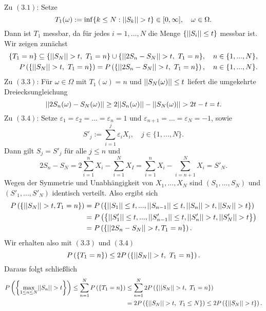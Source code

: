 \begin{proof*}
    Zu $(3.1)$:
    Setze 
    $$
        T_1(\omega) := \inf\{ k \leq N: \lvert\lvert S_k \rvert\rvert > t \} \in [0, \infty], \quad \omega \in \Omega. 
    $$
    Dann ist $T_1$ messbar, da für jedes $i =1,...,N$ die Menge $\{ \lvert\lvert S_i \rvert\rvert \leq t\}$ messbar ist. 
    Wir zeigen zunächst
    \begin{align}
        \{T_1 = n\} \subseteq \{\lvert\lvert S_N \rvert\rvert > t,\  T_1 = n\} \cup \{\lvert\lvert 2S_n - S_N \rvert\rvert>t,\  T_1=n\}, \quad n \in \{1,...,N\}, \\\
        P\left(\left\{ \lvert\lvert S_N \rvert\rvert > t, \ T_1=n \right\}\right) = P\left(\left\{ \lvert\lvert 2S_n - S_N \rvert\rvert > t,\  T_1=n \right\}\right), \quad n \in \{1,...,N\}. 
    \end{align}
    Zu $(3.3)$:
    Für $\omega \in \Omega$ mit $T_1(\omega) = n$ und $\lvert\lvert S_N(\omega) \rvert\rvert \leq t$ liefert die umgekehrte Dreiecksungleichung
    $$
        \lvert\lvert 2S_n(\omega) - S_N(\omega) \rvert\rvert \geq 2\lvert\lvert S_n(\omega) \rvert\rvert - \lvert\lvert S_N(\omega) \rvert\rvert > 2t - t = t. 
    $$
    Zu $(3.4)$: Setze $\varepsilon_1 = \varepsilon_2 = ... = \varepsilon_n = 1$ und $\varepsilon_{n+1} = ... = \varepsilon_N = -1$, sowie
    $$
        S'_j := \sum_{i=1}^j\varepsilon_i X_i, \quad j \in \{1,...,N\}. 
    $$
    Dann gilt $S_j = S'_j$ für alle $j \leq n$ und 
    $$
        2S_n - S_N = 2 \sum_{i=1}^n X_i - \sum_{i=1}^N X_I = \sum_{i=1}^nX_i - \sum_{i=n+1}^N X_i = S'_N. 
    $$
    Wegen der Symmetrie und Unabhängigkeit von $X_1,...,X_N$ sind $(S_1,...,S_N)$ und $(S'_1,...,S'_N)$ identisch verteilt. Also ergibt sich 
    \begin{align*}
        P\left(\left\{ \lvert\lvert S_N \rvert\rvert > t, T_1=n \right\}\right) &= P\left(\left\{ \lvert\lvert S_1 \rvert\rvert \leq t,...,\lvert\lvert S_{n-1} \rvert\rvert\leq t, \lvert\lvert S_n \rvert\rvert > t, \lvert\lvert S_N \rvert\rvert > t \right\}\right) \\\
                                   &= P\left(\left\{ \lvert\lvert S'_1 \rvert\rvert\leq t,...,\lvert\lvert S'_{n-1} \rvert\rvert\leq t, \lvert\lvert S'_n \rvert\rvert > t, \lvert\lvert S'_N \rvert\rvert > t \right\}\right) \\\
                                   &= P\left(\left\{ \lvert\lvert 2S_n - S_N \rvert\rvert > t, T_1=n \right\}\right). 
    \end{align*}
    Wir erhalten also mit $(3.3)$ und $(3.4)$ 
    $$
        P\left(\left\{ T_1=n \right\}\right) \leq 2 P\left(\left\{ \lvert\lvert S_N \rvert\rvert > t, \ T_1=n \right\}\right).
    $$
   Daraus folgt schließlich
    \begin{align*}
        P\left(\left\{ \max_{1 \leq n \leq N} \lvert\lvert S_n \rvert\rvert > t \right\}\right) \leq \sum_{n=1}^{N} P\left(\left\{ T_1=n \right\}\right) 
                                                     &\leq \sum_{n=1}^N2P\left(\left\{ \lvert\lvert S_N \rvert\rvert >t, \ T_1=n \right\}\right) \\\
                                                     &= 2 P\left(\left\{ \lvert\lvert S_N \rvert\rvert>t, \ T_1 \leq N \right\}\right) \leq 2 P\left(\left\{ \lvert\lvert S_N \rvert\rvert > t \right\}\right). 
    \end{align*}

\end{proof*}
